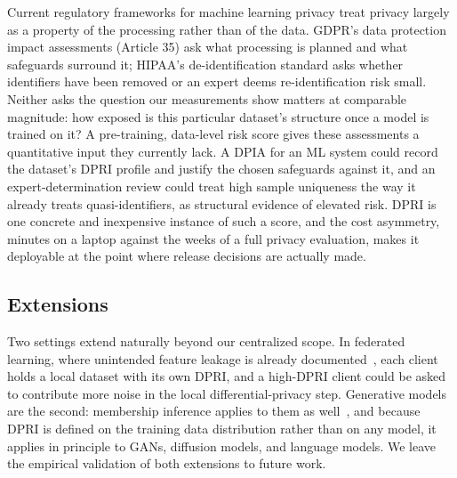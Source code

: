 Current regulatory frameworks for machine learning privacy treat privacy
largely as a property of the processing rather than of the data. GDPR's
data protection impact assessments (Article 35) ask what processing is
planned and what safeguards surround it; HIPAA's de-identification
standard asks whether identifiers have been removed or an expert deems
re-identification risk small. Neither asks the question our
measurements show matters at comparable magnitude: how exposed is this
particular dataset's structure once a model is trained on it? A
pre-training, data-level risk score gives these assessments a
quantitative input they currently lack. A DPIA for an ML system could
record the dataset's DPRI profile and justify the chosen safeguards
against it, and an expert-determination review could treat high sample
uniqueness the way it already treats quasi-identifiers, as structural
evidence of elevated risk. DPRI is one concrete and inexpensive
instance of such a score, and the cost asymmetry, minutes on a laptop
against the weeks of a full privacy evaluation, makes it deployable at
the point where release decisions are actually made.

\subsection{Extensions}

Two settings extend naturally beyond our centralized scope. In federated
learning, where unintended feature leakage is already
documented~\cite{melis2019exploiting}, each client holds a local dataset
with its own DPRI, and a high-DPRI client could be asked to contribute
more noise in the local differential-privacy step. Generative models are
the second: membership inference applies to them as
well~\cite{hayes2019logan,carlini2021extracting}, and because DPRI is
defined on the training data distribution rather than on any model, it
applies in principle to GANs, diffusion models, and language models. We
leave the empirical validation of both extensions to future work.
